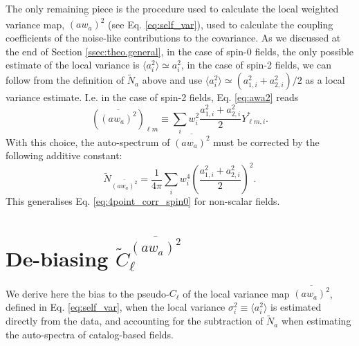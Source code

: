 \documentclass[aps,twocolumn, superscriptaddress, english, nofootinbib, 10pt]{revtex4-2}
\begin{document}
  The only remaining piece is the procedure used to calculate the local weighted variance map, $\overline{(aw_a)^2}$ (see Eq. \ref{eq:self_var}), used to calculate the coupling coefficients of the noise-like contributions to the covariance. As we discussed at the end of Section \ref{ssec:theo.general}, in the case of spin-0 fields, the only possible estimate of the local variance is $\langle a_i^2\rangle\simeq a_i^2$, in the case of spin-2 fields, we can follow from the definition of $\tilde{N}_a$ above and use $\langle a_i^2\rangle\simeq(a_{1,i}^2+a_{2,i}^2)/2$ as a local variance estimate. I.e. in the case of spin-2 fields, Eq. \ref{eq:awa2} reads
  \begin{equation}
      \left(\overline{(aw_a)^2}\right)_{\ell m}\equiv\sum_iw_i^2\frac{a_{1,i}^2+a_{2,i}^2}{2}Y_{\ell m,i}^*.
  \end{equation}
  With this choice, the auto-spectrum of $\overline{(aw_a)^2}$ must be corrected by the following additive constant:
  \begin{equation}
    \tilde{N}_{\overline{(aw_a)^2}}=\frac{1}{4\pi}\sum_iw_i^4\left(\frac{a_{1,i}^2+a_{2,i}^2}{2}\right)^2.
  \end{equation}
  This generalises Eq. \ref{eq:4point_corr_spin0} for non-scalar fields.

\section{De-biasing $\tilde{C}_\ell^{\overline{(aw_a)^2}}$}\label{app:awa2_shotnoise}
  We derive here the bias to the pseudo-$C_\ell$ of the local variance map $\overline{(aw_a)^2}$, defined in Eq. \ref{eq:self_var}, when the local variance $\sigma_i^2\equiv \langle a_i^2\rangle$ is estimated directly from the data, and accounting for the subtraction of $\tilde{N}_a$ when estimating the auto-spectra of catalog-based fields.
\end{document}
